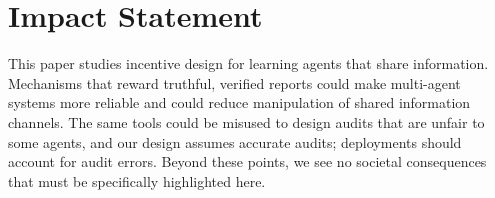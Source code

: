 \documentclass{article}
\theoremstyle{plain}
\theoremstyle{definition}
\theoremstyle{remark}
\begin{document}

\section*{Impact Statement}
This paper studies incentive design for learning agents that share information.
Mechanisms that reward truthful, verified reports could make multi-agent systems more reliable and could reduce manipulation of shared information channels.
The same tools could be misused to design audits that are unfair to some agents, and our design assumes accurate audits; deployments should account for audit errors.
Beyond these points, we see no societal consequences that must be specifically highlighted here.




\newpage
\appendix
\onecolumn

\end{document}

